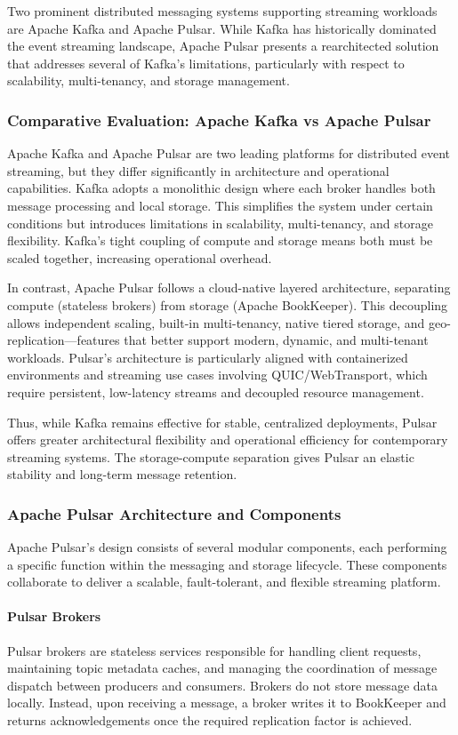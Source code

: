 Two prominent distributed messaging systems supporting streaming workloads are Apache Kafka and Apache Pulsar. While Kafka has historically dominated the event streaming landscape, Apache Pulsar presents a rearchitected solution that addresses several of Kafka's limitations, particularly with respect to scalability, multi-tenancy, and storage management.

\subsubsection{Comparative Evaluation: Apache Kafka vs Apache Pulsar}
Apache Kafka and Apache Pulsar are two leading platforms for distributed event streaming, but they differ significantly in architecture and operational capabilities. Kafka adopts a monolithic design where each broker handles both message processing and local storage. This simplifies the system under certain conditions but introduces limitations in scalability, multi-tenancy, and storage flexibility. Kafka's tight coupling of compute and storage means both must be scaled together, increasing operational overhead.

In contrast, Apache Pulsar follows a cloud-native layered architecture, separating compute (stateless brokers) from storage (Apache BookKeeper). This decoupling allows independent scaling, built-in multi-tenancy, native tiered storage, and geo-replication—features that better support modern, dynamic, and multi-tenant workloads. Pulsar's architecture is particularly aligned with containerized environments and streaming use cases involving QUIC/WebTransport, which require persistent, low-latency streams and decoupled resource management.

Thus, while Kafka remains effective for stable, centralized deployments, Pulsar offers greater architectural flexibility and operational efficiency for contemporary streaming systems. The storage-compute separation gives Pulsar an elastic stability and long-term message retention.

\subsubsection{Apache Pulsar Architecture and Components}
Apache Pulsar's design consists of several modular components, each performing a specific function within the messaging and storage lifecycle. These components collaborate to deliver a scalable, fault-tolerant, and flexible streaming platform.

\paragraph{Pulsar Brokers}
Pulsar brokers are stateless services responsible for handling client requests, maintaining topic metadata caches, and managing the coordination of message dispatch between producers and consumers. Brokers do not store message data locally. Instead, upon receiving a message, a broker writes it to BookKeeper and returns acknowledgements once the required replication factor is achieved.

